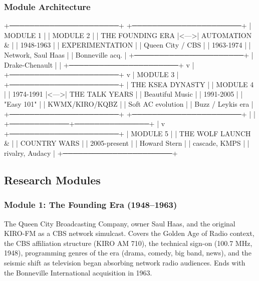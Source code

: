 \documentclass[11pt,letterpaper]{article}
\begin{document}
\subsubsection{Module Architecture}

\begin{asciibox}
+──────────────────────+     +──────────────────────+
|  MODULE 1            |     |  MODULE 2            |
|  THE FOUNDING ERA    |<--->|  AUTOMATION &        |
|  1948-1963           |     |  EXPERIMENTATION     |
|  Queen City / CBS    |     |  1963-1974           |
|  Network, Saul Haas  |     |  Bonneville acq.     |
+──────────────────────+     |  Drake-Chenault      |
           |                 +──────────────────────+
           v                            |
+──────────────────────+                v
|  MODULE 3            |     +──────────────────────+
|  THE KSEA DYNASTY    |     |  MODULE 4            |
|  1974-1991           |<--->|  THE TALK YEARS      |
|  Beautiful Music     |     |  1991-2005           |
|  "Easy 101"          |     |  KWMX/KIRO/KQBZ      |
|  Soft AC evolution   |     |  Buzz / Leykis era   |
+──────────────────────+     +──────────────────────+
           |                            |
           +────────────+───────────────+
                        |
                        v
           +──────────────────────+
           |  MODULE 5            |
           |  THE WOLF LAUNCH &   |
           |  COUNTRY WARS        |
           |  2005-present        |
           |  Howard Stern        |
           |  cascade, KMPS       |
           |  rivalry, Audacy     |
           +──────────────────────+
\end{asciibox}

\subsection{Research Modules}

\subsubsection{Module 1: The Founding Era (1948--1963)}
The Queen City Broadcasting Company, owner Saul Haas, and the original KIRO-FM as a CBS network simulcast. Covers the Golden Age of Radio context, the CBS affiliation structure (KIRO AM 710), the technical sign-on (100.7 MHz, 1948), programming genres of the era (drama, comedy, big band, news), and the seismic shift as television began absorbing network radio audiences. Ends with the Bonneville International acquisition in 1963.
\end{document}
